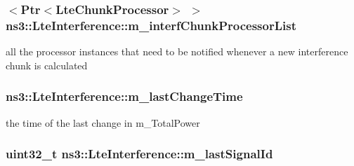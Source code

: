\subsubsection[{\texorpdfstring{m\+\_\+interf\+Chunk\+Processor\+List}{m_interfChunkProcessorList}}]{$<${\bf Ptr}$<${\bf Lte\+Chunk\+Processor}$>$ $>$ ns3\+::\+Lte\+Interference\+::m\+\_\+interf\+Chunk\+Processor\+List\hspace{0.3cm}{\ttfamily [private]}}\hypertarget{classns3_1_1LteInterference_abd2337c56d85ec7775f6ae1e7c2036cc}{}\label{classns3_1_1LteInterference_abd2337c56d85ec7775f6ae1e7c2036cc}
all the processor instances that need to be notified whenever a new interference chunk is calculated 
\subsubsection[{\texorpdfstring{m\+\_\+last\+Change\+Time}{m_lastChangeTime}}]{ ns3\+::\+Lte\+Interference\+::m\+\_\+last\+Change\+Time\hspace{0.3cm}{\ttfamily [private]}}\hypertarget{classns3_1_1LteInterference_ab694cd3b025f150e39b071e0f3d294a7}{}\label{classns3_1_1LteInterference_ab694cd3b025f150e39b071e0f3d294a7}
the time of the last change in m\+\_\+\+Total\+Power 
\subsubsection[{\texorpdfstring{m\+\_\+last\+Signal\+Id}{m_lastSignalId}}]{\setlength{\rightskip}{0pt plus 5cm}uint32\+\_\+t ns3\+::\+Lte\+Interference\+::m\+\_\+last\+Signal\+Id\hspace{0.3cm}{\ttfamily [private]}}\hypertarget{classns3_1_1LteInterference_acc72a7fdc9bf2fa8389eae7286aa5362}{}\label{classns3_1_1LteInterference_acc72a7fdc9bf2fa8389eae7286aa5362}
